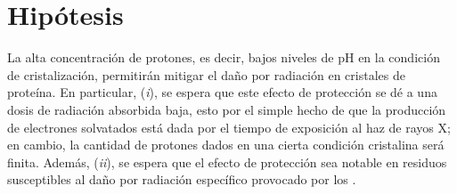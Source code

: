 \chapter{Hipótesis}

La alta concentración de protones, es decir, bajos niveles de pH en la condición de cristalización, permitirán mitigar el daño por radiación en cristales de proteína. En particular, (\emph{i}), se espera que este efecto de protección se dé a una dosis de radiación absorbida baja, esto por el simple hecho de que la producción de electrones solvatados está dada por el tiempo de exposición al haz de rayos X; en cambio, la cantidad de protones dados en una cierta condición cristalina será finita. Además, (\emph{ii}), se espera que el efecto de protección sea notable en residuos susceptibles al daño por radiación específico provocado por los .
	
